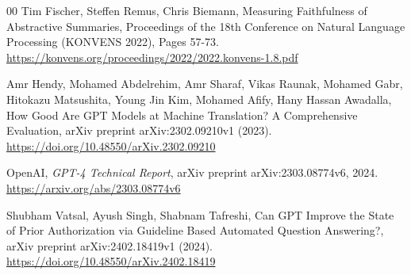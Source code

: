 \documentclass[preprint,12pt]{elsarticle}
\begin{document}
\begin{thebibliography}{00}
Tim Fischer, Steffen Remus, Chris Biemann,
Measuring Faithfulness of Abstractive Summaries,
Proceedings of the 18th Conference on Natural Language Processing (KONVENS 2022), Pages 57-73.
\href{https://konvens.org/proceedings/2022/2022.konvens-1.8.pdf}{https://konvens.org/proceedings/2022/2022.konvens-1.8.pdf}


Amr Hendy, Mohamed Abdelrehim, Amr Sharaf, Vikas Raunak, Mohamed Gabr, Hitokazu Matsushita, Young Jin Kim, Mohamed Afify, Hany Hassan Awadalla,
How Good Are GPT Models at Machine Translation? A Comprehensive Evaluation,
arXiv preprint arXiv:2302.09210v1 (2023). 
\href{https://doi.org/10.48550/arXiv.2302.09210}{https://doi.org/10.48550/arXiv.2302.09210}


OpenAI,
\textit{GPT-4 Technical Report},
arXiv preprint arXiv:2303.08774v6, 2024.
\href{https://arxiv.org/abs/2303.08774v6}{https://arxiv.org/abs/2303.08774v6}

Shubham Vatsal, Ayush Singh, Shabnam Tafreshi, 
Can GPT Improve the State of Prior Authorization via Guideline Based Automated Question Answering?,
arXiv preprint arXiv:2402.18419v1 (2024).
\href{https://doi.org/10.48550/arXiv.2402.18419}{https://doi.org/10.48550/arXiv.2402.18419}




\end{thebibliography}
\end{document}
